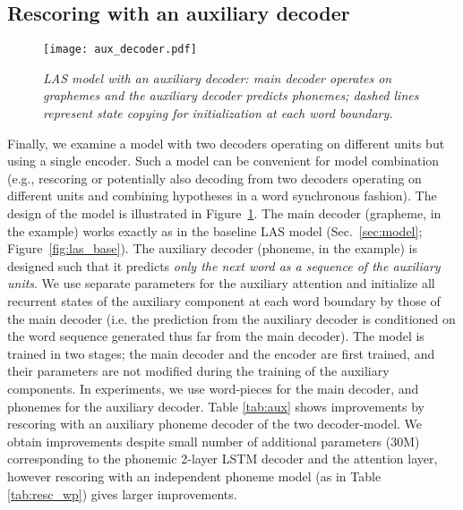 \subsection{Rescoring with an auxiliary decoder}
      \vspace{-1mm}
\begin{figure}[t]
  \centerline{\texttt{[image: aux\_decoder.pdf]}}
        \vspace{-1mm}
	\caption{\it LAS model with an auxiliary decoder: main
	decoder operates on graphemes and the auxiliary decoder predicts
	phonemes; dashed lines represent state copying for initialization at
	each word boundary.}
	\label{fig:las_aux}
	\vspace{-6mm}
\end{figure}
\label{sec:twodecmodel}
Finally, we examine a model with two decoders operating on different units but using a single encoder.
Such a model can be convenient for model combination (e.g., rescoring or potentially also decoding from two decoders operating on different units and combining hypotheses in a word synchronous fashion).
The design of the model is illustrated in Figure~\ref{fig:las_aux}.
The main decoder (grapheme, in the example) works exactly as in the baseline LAS model (Sec.~\ref{sec:model}; Figure~\ref{fig:las_base}).
The auxiliary decoder (phoneme, in the example) is designed such that it
predicts \emph{only the next word as a sequence of the auxiliary units}.
We use separate parameters for the auxiliary attention and initialize all recurrent states
of the auxiliary component at each word boundary by those of the main decoder (i.e. the prediction
from the auxiliary decoder is conditioned on the word sequence generated thus far from the main decoder).
The model is trained in two stages;
the main decoder and the encoder are first trained, and their parameters are not modified during the training of
the auxiliary components.
In experiments, we use word-pieces for the main decoder, and phonemes for the
auxiliary decoder.
Table \ref{tab:aux} shows improvements by rescoring with an auxiliary phoneme decoder of the two decoder-model.
We obtain improvements despite small number of additional parameters (30M) corresponding to the phonemic 2-layer LSTM decoder and the attention layer, however rescoring with an independent phoneme model (as in Table \ref{tab:resc_wp}) gives larger improvements.
\vspace{-3mm}
